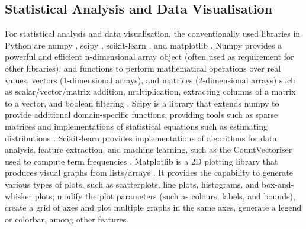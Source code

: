 \documentclass{report}
\begin{document}
\subsection{Statistical Analysis and Data Visualisation} \label{tc-visualisation}
For statistical analysis and data visualisation, the conventionally used libraries in Python are numpy \cite{Numpy}, scipy \cite{Scipy}, scikit-learn \cite{Scikit-learn}, and matplotlib \cite{Matplotlib}. 
Numpy provides a powerful and efficient n-dimensional array object (often used as requirement for other libraries), and functions to perform mathematical operations over real values, vectors (1-dimensional arrays), and matrices (2-dimensional arrays) such as scalar/vector/matrix addition, multiplication, extracting columns of a matrix to a vector, and boolean filtering \cite{Numpy}.
Scipy is a library that extends numpy to provide additional domain-specific functions, providing tools such as sparse matrices and implementations of statistical equations such as estimating distributions \cite{Scipy}. 
Scikit-learn provides implementations of algorithms for data analysis, feature extraction, and machine learning, such as the CountVectoriser used to compute term frequencies \cite{Scikit-learn}.
Matplotlib is a 2D plotting library that produces visual graphs from lists/arrays \cite{Matplotlib}.
It provides the capability to generate various types of plots, such as scatterplots, line plots, histograms, and box-and-whisker plots; modify the plot parameters (such as colours, labels, and bounds), create a grid of axes and plot multiple graphs in the same axes, generate a legend or colorbar, among other features.
\end{document}
